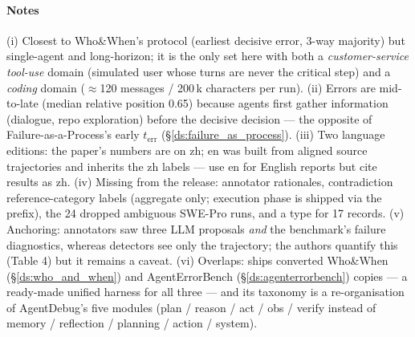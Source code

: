 \paragraph{Notes} (i) Closest to Who\&When's protocol (earliest decisive error, 3-way majority) but single-agent and long-horizon; it is the only set here with both a \emph{customer-service tool-use} domain (simulated user whose turns are never the critical step) and a \emph{coding} domain ($\approx$120 messages / 200\,k characters per run). (ii) Errors are mid-to-late (median relative position 0.65) because agents first gather information (dialogue, repo exploration) before the decisive decision --- the opposite of Failure-as-a-Process's early $t_{\mathrm{err}}$ (\S\ref{ds:failure_as_process}). (iii) Two language editions: the paper's numbers are on zh; en was built from aligned source trajectories and inherits the zh labels --- use en for English reports but cite results as zh. (iv) Missing from the release: annotator rationales, contradiction reference-category labels (aggregate only; execution phase is shipped via the  prefix), the 24 dropped ambiguous SWE-Pro runs, and a type for 17 records. (v) Anchoring: annotators saw three LLM proposals \emph{and} the benchmark's failure diagnostics, whereas detectors see only the trajectory; the authors quantify this (Table 4) but it remains a caveat. (vi) Overlaps: ships converted Who\&When (\S\ref{ds:who_and_when}) and AgentErrorBench (\S\ref{ds:agenterrorbench}) copies --- a ready-made unified harness for all three --- and its taxonomy is a re-organisation of AgentDebug's five modules (plan / reason / act / obs / verify instead of memory / reflection / planning / action / system).

